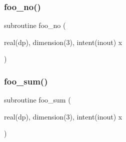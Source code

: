 \subsubsection{\texorpdfstring{foo\+\_\+no()}{foo\_no()}}
{\footnotesize\ttfamily subroutine foo\+\_\+no (\begin{DoxyParamCaption}\item[{real(dp), dimension(3), intent(inout)}]{x }\end{DoxyParamCaption})}

\mbox{\label{constant__both_8f90_ac0da88a3f3be66d54ed400a9070094a3}} 
\subsubsection{\texorpdfstring{foo\+\_\+sum()}{foo\_sum()}}
{\footnotesize\ttfamily subroutine foo\+\_\+sum (\begin{DoxyParamCaption}\item[{real(dp), dimension(3), intent(inout)}]{x }\end{DoxyParamCaption})}

